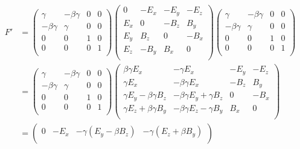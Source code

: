 \documentclass[twoside]{article}
\begin{document}
\begin{align*}
    F'&=
    \begin{pmatrix}
    	\gamma		& -\beta\gamma 	& 0 & 0 \\
        -\beta\gamma 	&  \gamma		& 0 & 0 \\
         		0		& 		0		& 1 & 0 \\
          		0		&		0		& 0 & 1 \\
    \end{pmatrix}
    \begin{pmatrix}
        0	& -E_x 	& -E_y 	& -E_z \\
        E_x & 0		& -B_z 	& B_y  \\
        E_y	& B_z	& 0 	& -B_x \\
        E_z	& -B_y	& B_x 	& 0    \\
    \end{pmatrix}
    \begin{pmatrix}
    	\gamma		& -\beta\gamma 	& 0 & 0 \\
        -\beta\gamma 	&  \gamma		& 0 & 0 \\
         	0		& 		0		& 1 & 0 \\
     		0		&		0		& 0 & 1 \\
    \end{pmatrix} \\
    &=
    \begin{pmatrix}
    	\gamma		& -\beta\gamma 	& 0 & 0 \\
        -\beta\gamma 	&  \gamma		& 0 & 0 \\
     		0		& 		0		& 1 & 0 \\
     		0		&		0		& 0 & 1 \\
    \end{pmatrix}
    \begin{pmatrix}
        \beta \gamma E_x				& -\gamma E_x					& -E_y 	& -E_z \\
        \gamma E_x						& -\beta \gamma E_x				& -B_z	& B_y  \\
        \gamma E_y - \beta \gamma B_z	& -\beta \gamma E_y+\gamma B_z	& 0		& -B_x \\
        \gamma E_z + \beta \gamma B_y 	& -\beta \gamma E_z-\gamma B_y	& B_x 	& 0    \\
    \end{pmatrix} \\
    &=
    \begin{pmatrix}
        0						& -E_x 					& -\gamma (E_y-\beta B_z)	& -\gamma (E_z+\beta B_y) \\

\end{pmatrix}
\end{align*}
\end{document}

